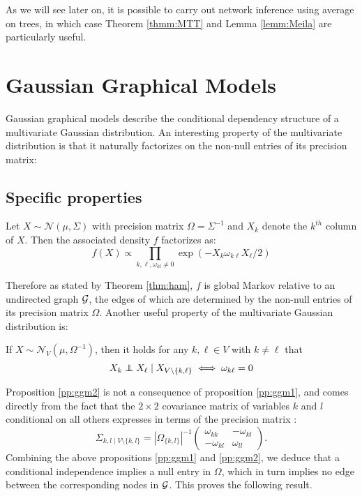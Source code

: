 As we will see later on, it is possible to carry out network inference using average on trees, in which case  Theorem \ref{thmm:MTT} and Lemma \ref{lemm:Meila} are particularly useful.

 \section{Gaussian Graphical Models}
 Gaussian graphical models describe the conditional dependency structure of a  multivariate Gaussian distribution. An interesting property of the multivariate distribution is that it naturally factorizes on the non-null entries of its precision matrix: 
 
 \subsection{Specific properties}
 \begin{prop}\label{pp:ggm1}
 Let $X\sim \mathcal{N}(\mu, \Sigma)$ with precision matrix $\Omega=\Sigma^{-1}$ and $X_k$ denote the $k^{th}$ column of $X$. Then the associated density $f$ factorizes as:
 $$f(X) \propto \prod_{k,\ell, \omega_{kl}\neq 0} \exp(-X_{k}\omega_{k\ell}X_{\ell}/2)$$
 \end{prop}
 Therefore as stated by Theorem \ref{thm:ham}, $f$ is global Markov relative to an undirected graph $\mathcal{G}$, the edges of which are determined by the non-null entries of its precision matrix $\Omega$.  Another useful property of the multivariate Gaussian distribution is:
 
 \begin{prop}\label{pp:ggm2}If  $X\sim \mathcal{N}_V(\mu, \Omega^{-1})$, then it holds for any $k,\ell\in V$ with $k\neq \ell$ that
$$X_k \independent X_\ell \mid X_{V\setminus\{k,\ell\}} \iff \omega_{k\ell}=0 $$
 \end{prop}
  Proposition \ref{pp:ggm2} is not a consequence of proposition \ref{pp:ggm1}, and comes directly from the fact that the $2\times 2$  covariance matrix of variables $k$ and $l$ conditional on all others expresses in terms of the precision matrix : $$\Sigma_{k,l\mid V\setminus\{k,l\}} = |\Omega_{\{k,l\}}|^{-1} \left(\begin{array}{cc}
\omega_{kk} & -\omega_{kl}\\
-\omega_{kl} & \omega_{ll}  
  \end{array}\right).$$
Combining the above propositions \ref{pp:ggm1} and \ref{pp:ggm2}, we deduce that a conditional independence implies a null entry in $\Omega$, which in turn implies no edge between the corresponding nodes in $\mathcal{G}$. This proves the following result.

